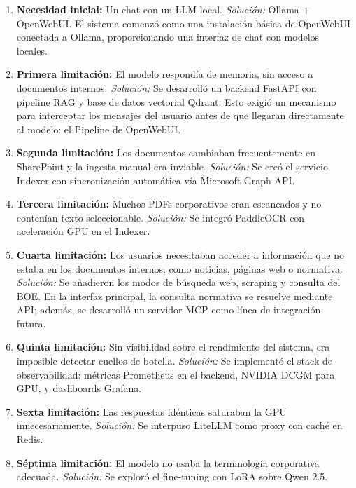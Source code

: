 \begin{enumerate}
    \item \textbf{Necesidad inicial:} Un chat con un LLM local. \textit{Solución:} Ollama + OpenWebUI. El sistema comenzó como una instalación básica de OpenWebUI conectada a Ollama, proporcionando una interfaz de chat con modelos locales.

    \item \textbf{Primera limitación:} El modelo respondía de memoria, sin acceso a documentos internos. \textit{Solución:} Se desarrolló un backend FastAPI con pipeline RAG y base de datos vectorial Qdrant. Esto exigió un mecanismo para interceptar los mensajes del usuario antes de que llegaran directamente al modelo: el Pipeline de OpenWebUI.

    \item \textbf{Segunda limitación:} Los documentos cambiaban frecuentemente en SharePoint y la ingesta manual era inviable. \textit{Solución:} Se creó el servicio Indexer con sincronización automática vía Microsoft Graph API.

    \item \textbf{Tercera limitación:} Muchos PDFs corporativos eran escaneados y no contenían texto seleccionable. \textit{Solución:} Se integró PaddleOCR con aceleración GPU en el Indexer.

    \item \textbf{Cuarta limitación:} Los usuarios necesitaban acceder a información que no estaba en los documentos internos, como noticias, páginas web o normativa. \textit{Solución:} Se añadieron los modos de búsqueda web, scraping y consulta del BOE. En la interfaz principal, la consulta normativa se resuelve mediante API; además, se desarrolló un servidor MCP como línea de integración futura.

    \item \textbf{Quinta limitación:} Sin visibilidad sobre el rendimiento del sistema, era imposible detectar cuellos de botella. \textit{Solución:} Se implementó el stack de observabilidad: métricas Prometheus en el backend, NVIDIA DCGM para GPU, y dashboards Grafana.

    \item \textbf{Sexta limitación:} Las respuestas idénticas saturaban la GPU innecesariamente. \textit{Solución:} Se interpuso LiteLLM como proxy con caché en Redis.

    \item \textbf{Séptima limitación:} El modelo no usaba la terminología corporativa adecuada. \textit{Solución:} Se exploró el fine-tuning con LoRA sobre Qwen 2.5.
\end{enumerate}

